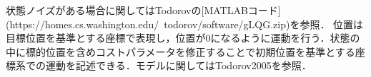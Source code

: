 状態ノイズがある場合に関してはTodorovの[MATLABコード](https://homes.cs.washington.edu/~todorov/software/gLQG.zip)を参照．
位置は目標位置を基準とする座標で表現し，位置が0になるように運動を行う．状態の中に標的位置を含めコストパラメータを修正することで初期位置を基準とする座標系での運動を記述できる．モデルに関してはTodorov2005を参照．